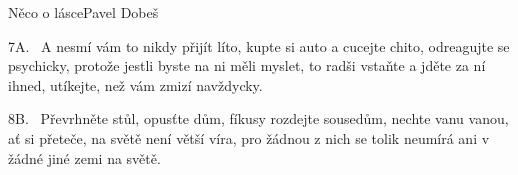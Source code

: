 \begin{song}{Něco o lásce}{Pavel Dobeš}
\begin{xverse}{7A.~}
A nesmí vám to nikdy přijít líto,
kupte si auto a cucejte chito,
odreagujte se psychicky,
protože jestli byste na ni měli myslet,
to radši vstaňte a jděte za ní ihned,
utíkejte, než vám zmizí navždycky.
\end{xverse}

\begin{xverse}{8B.~}
Převrhněte stůl, opusťte dům,
fíkusy rozdejte sousedům,
nechte vanu vanou, ať si přeteče,
na světě není větší víra,
pro žádnou z nich se tolik neumírá
ani v žádné jiné zemi na světě.
\end{xverse}

\end{song}


%
%
%
%
%
%
%
%

